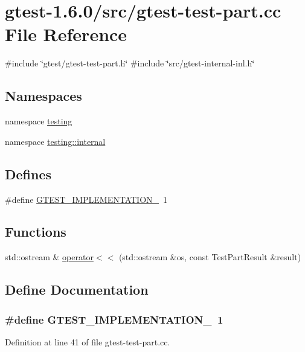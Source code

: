 \hypertarget{gtest-test-part_8cc}{\section{gtest-\/1.6.0/src/gtest-\/test-\/part.cc \-File \-Reference}
\label{d3/dc2/gtest-test-part_8cc}
}
{\ttfamily \#include \char`\"{}gtest/gtest-\/test-\/part.\-h\char`\"{}}\*
{\ttfamily \#include \char`\"{}src/gtest-\/internal-\/inl.\-h\char`\"{}}\*
\subsection*{\-Namespaces}
\begin{DoxyCompactItemize}
\item 
namespace \hyperlink{namespacetesting}{testing}
\item 
namespace \hyperlink{namespacetesting_1_1internal}{testing\-::internal}
\end{DoxyCompactItemize}
\subsection*{\-Defines}
\begin{DoxyCompactItemize}
\item 
\#define \hyperlink{gtest-test-part_8cc_a83bd232fd1077579fada92c31bb7469f}{\-G\-T\-E\-S\-T\-\_\-\-I\-M\-P\-L\-E\-M\-E\-N\-T\-A\-T\-I\-O\-N\-\_\-}~1
\end{DoxyCompactItemize}
\subsection*{\-Functions}
\begin{DoxyCompactItemize}
\item 
std\-::ostream \& \hyperlink{namespacetesting_ae8b6df347210c0ebfe5ec995d03c7aed}{operator$<$$<$} (std\-::ostream \&os, const \-Test\-Part\-Result \&result)
\end{DoxyCompactItemize}


\subsection{\-Define \-Documentation}
\hypertarget{gtest-test-part_8cc_a83bd232fd1077579fada92c31bb7469f}{
\subsubsection[{\-G\-T\-E\-S\-T\-\_\-\-I\-M\-P\-L\-E\-M\-E\-N\-T\-A\-T\-I\-O\-N\-\_\-}]{\setlength{\rightskip}{0pt plus 5cm}\#define {\bf \-G\-T\-E\-S\-T\-\_\-\-I\-M\-P\-L\-E\-M\-E\-N\-T\-A\-T\-I\-O\-N\-\_\-}~1}}\label{d3/dc2/gtest-test-part_8cc_a83bd232fd1077579fada92c31bb7469f}


\-Definition at line 41 of file gtest-\/test-\/part.\-cc.

